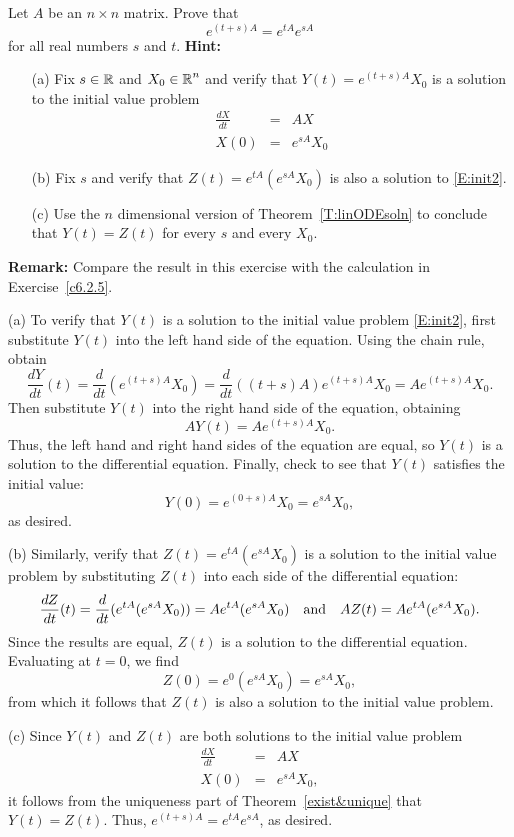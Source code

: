 \documentclass{ximera}
\begin{document}
\begin{exercise}  \label{c6.2.5B}
Let $A$ be an $n\times n$ matrix.  Prove that
\[
e^{(t+s)A} = e^{tA}e^{sA}
\]
for all real numbers $s$ and $t$.  {\bf Hint:}
\begin{itemize}
\item[(a)]  Fix $s\in\mbox{$\Bbb{R}$}$ and $X_0\in\mbox{$\Bbb{R}$}^n$ and verify that
$Y(t) = e^{(t+s)A}X_0$ is a solution to the initial value problem
\begin{equation}  \label{E:init2}
\begin{array}{rcl}
\frac{dX}{dt} & = & AX \\
X(0) & = & e^{sA}X_0
\end{array}
\end{equation}
\item[(b)] Fix $s$ and verify that $Z(t) = e^{tA}\left(e^{sA}X_0\right)$ is
also a solution to \eqref{E:init2}.
\item[(c)]  Use the $n$ dimensional version of Theorem~\ref{T:linODEsoln} to
conclude that $Y(t)=Z(t)$ for every $s$ and every $X_0$.
\end{itemize}
{\bf Remark:}  Compare the result in this exercise with the calculation in
Exercise~\ref{c6.2.5}.

\begin{solution}

(a) To verify that $Y(t)$ is a solution to the initial value problem
\eqref{E:init2}, first substitute $Y(t)$ into the left hand side of the
equation.  Using the chain rule, obtain
\[
\frac{dY}{dt}(t) = \frac{d}{dt}(e^{(t + s)A}X_0) =
\frac{d}{dt}((t + s)A)e^{(t + s)A}X_0 = Ae^{(t + s)A}X_0.
\]
Then substitute $Y(t)$ into the right hand side of the equation, obtaining
\[
AY(t) = Ae^{(t + s)A}X_0.
\]
Thus, the left hand and right hand sides of the equation are equal, so
$Y(t)$ is a solution to the differential equation.  Finally, check to see
that $Y(t)$ satisfies the initial value:
\[
Y(0) = e^{(0 + s)A}X_0 = e^{sA}X_0,
\]
as desired.

(b) Similarly, verify that $Z(t) = e^{tA}(e^{sA}X_0)$ is a solution to the
initial value problem by substituting $Z(t)$ into each side of the
differential equation:
\[
\frac{dZ}{dt}(t) = \frac{d}{dt}(e^{tA}(e^{sA}X_0))
= Ae^{tA}(e^{sA}X_0) \quad\mbox{and}\quad
AZ(t) = Ae^{tA}(e^{sA}X_0).
\]
Since the results are equal, $Z(t)$ is a solution to the differential
equation.  Evaluating at $t = 0$, we find
\[
Z(0) = e^{0}(e^{sA}X_0) = e^{sA}X_0,
\]
from which it follows that $Z(t)$ is also a solution to the initial
value problem.

(c) Since $Y(t)$ and $Z(t)$ are both solutions to the initial value problem
\[
\begin{array}{rcl}
\frac{dX}{dt} & = & AX \\
X(0) & = & e^{sA}X_0,
\end{array}
\]
it follows from the uniqueness part of Theorem~\ref{exist&unique} that
$Y(t) = Z(t)$.  Thus, $e^{(t + s)A} = e^{tA}e^{sA}$, as desired.


\end{solution}
\end{exercise}
\end{document}
